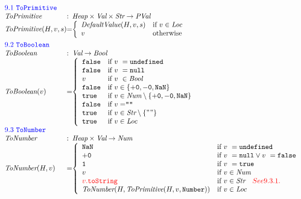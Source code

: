 \documentclass[a4paper, leqno]{amsart}
\def\inred{\color{red}}
\def\inblue{\color{blue}}
\newcommand{\nullK}{{\tt null}}
\newcommand{\undef}{{\tt undefined}}
\newcommand{\false}{{\tt false}}
\newcommand{\true}{{\tt true}}
\newcommand{\Bool}{\emph{Bool}}
\newcommand{\pval}{\emph{PVal}}
\newcommand{\Val}{\emph{Val}}
\newcommand{\Loc}{\emph{Loc}}
\newcommand{\Str}{\emph{Str}}
\newcommand{\Num}{\emph{Num}}
\newcommand{\Heap}{\emph{Heap}}
\newcommand{\hf}[1]{\emph{#1}}
\def\inred{\color{red}}
\def\inblue{\color{blue}}
\begin{document}
\[
\begin{array}{l@{}l@{}ll}
\multicolumn{3}{l}{\mbox{\inblue 9.1 {\tt ToPrimitive}}}\\
\hf{ToPrimitive} & :& \Heap \times \Val \times \Str \rightarrow \pval \\
\hf{ToPrimitive}(H,v,s) &=&
\left\{ \begin{array}{ll}
\hf{DefaultValue}(H,v,s) &\mbox{if $v\in\Loc$}\\
v&\mbox{otherwise}\\
\end{array}
\right.
\\[1em]

\multicolumn{3}{l}{\mbox{\inblue 9.2 {\tt ToBoolean}}}\\
\hf{ToBoolean} & :& \Val \rightarrow \Bool \\
\hf{ToBoolean}(v) &=&
\left\{ \begin{array}{ll}
\false &\mbox{if $v\ = \undef$}\\
\false &\mbox{if $v\ = \nullK$}\\
v &\mbox{if $v\ \in \Bool$}\\
\false &\mbox{if $v\in\{{\tt +0}, {\tt -0}, {\tt NaN}\}$}\\
\true &\mbox{if $v\in\Num\setminus\{{\tt +0}, {\tt -0}, {\tt NaN}\}$}\\
\false &\mbox{if $v = ${\tt ""}}\\
\true &\mbox{if $v\in\Str\setminus\{{\tt ""}\}$}\\
\true &\mbox{if $v\in\Loc$}\\
\end{array}
\right.
\\[1em]

\multicolumn{3}{l}{\mbox{\inblue 9.3 {\tt ToNumber}}}\\
\hf{ToNumber} & :& \Heap \times \Val \rightarrow \Num \\
\hf{ToNumber}(H,v) &=&
\left\{ \begin{array}{ll}
{\tt NaN} &\mbox{if $v\ = \undef$}\\
{\tt +0} &\mbox{if $v\ = \nullK \vee v\ = \false$}\\
{\tt 1} &\mbox{if $v\ = \true$}\\
v &\mbox{if $v\in\Num$}\\
{\inred v.{\tt toString}} &\mbox{if $v\in\Str\quad{\inred See 9.3.1.}$}\\
\hf{ToNumber}(H,\hf{ToPrimitive}(H,v,\verb+Number+)) &\mbox{if $v\in\Loc$}\\
\end{array}
\right.
\\[1em]



\end{array}\]
\end{document}
